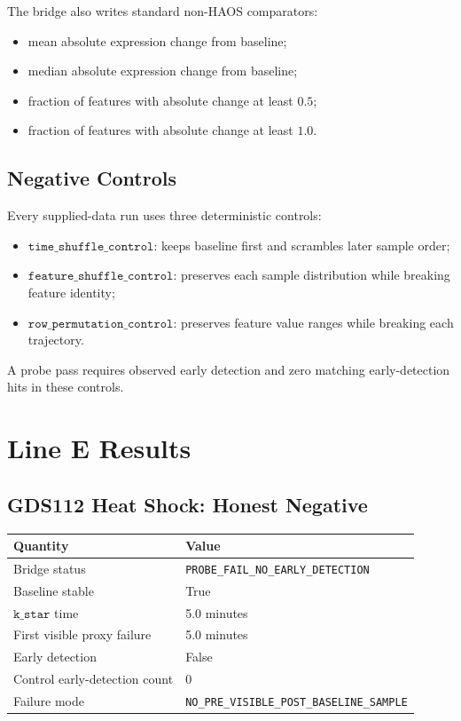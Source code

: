 \documentclass[11pt]{article}
\begin{document}
The bridge also writes standard non-HAOS comparators:

\begin{itemize}
\item mean absolute expression change from baseline;
\item median absolute expression change from baseline;
\item fraction of features with absolute change at least \(0.5\);
\item fraction of features with absolute change at least \(1.0\).
\end{itemize}

\subsection{Negative Controls}

Every supplied-data run uses three deterministic controls:

\begin{itemize}
\item \(\texttt{time\_shuffle\_control}\): keeps baseline first and scrambles later sample order;
\item \(\texttt{feature\_shuffle\_control}\): preserves each sample distribution while breaking feature identity;
\item \(\texttt{row\_permutation\_control}\): preserves feature value ranges while breaking each trajectory.
\end{itemize}

A probe pass requires observed early detection and zero matching early-detection hits in these controls.

\section{Line E Results}

\subsection{GDS112 Heat Shock: Honest Negative}

\begin{center}
\begin{tabular}{ll}
\toprule
Quantity & Value \\
\midrule
Bridge status & \texttt{PROBE\_FAIL\_NO\_EARLY\_DETECTION} \\
Baseline stable & True \\
\(\texttt{k\_star}\) time & 5.0 minutes \\
First visible proxy failure & 5.0 minutes \\
Early detection & False \\
Control early-detection count & 0 \\
Failure mode & \texttt{NO\_PRE\_VISIBLE\_POST\_BASELINE\_SAMPLE} \\
\bottomrule
\end{tabular}
\end{center}
\end{document}
